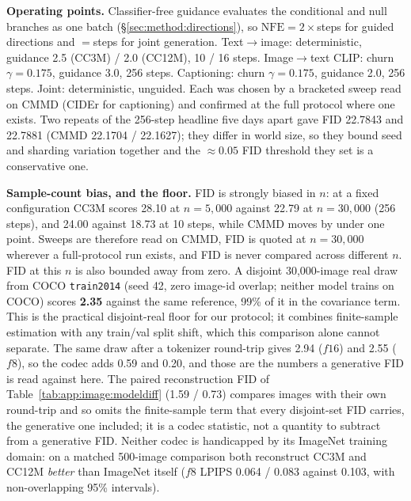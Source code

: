 \textbf{Operating points.} Classifier-free guidance evaluates the conditional and null branches as
one batch (\S\ref{sec:method:directions}), so $\mathrm{NFE}=2\times$steps for guided directions and
$=$steps for joint generation. Text$\rightarrow$image: deterministic, guidance 2.5 (CC3M) / 2.0
(CC12M), 10 / 16 steps. Image$\rightarrow$text CLIP: churn $\gamma{=}0.175$, guidance 3.0, 256
steps. Captioning: churn $\gamma{=}0.175$, guidance 2.0, 256 steps. Joint: deterministic,
unguided. Each was chosen by a bracketed sweep read on CMMD (CIDEr for captioning) and confirmed
at the full protocol where one exists. Two repeats of the 256-step headline five days apart gave
FID 22.7843 and 22.7881 (CMMD 22.1704 / 22.1627); they differ in world size, so they bound seed
and sharding variation together and the $\approx0.05$ FID threshold they set is a conservative
one.

\textbf{Sample-count bias, and the floor.} FID is strongly biased in $n$: at a fixed configuration
CC3M scores 28.10 at $n{=}5{,}000$ against 22.79 at $n{=}30{,}000$ (256 steps), and 24.00 against
18.73 at 10 steps, while CMMD moves by under one point. Sweeps are therefore read on CMMD, FID is
quoted at $n{=}30{,}000$ wherever a full-protocol run exists, and FID is never compared across
different $n$. FID at this $n$ is also bounded away from zero. A disjoint 30{,}000-image real draw
from COCO \texttt{train2014} (seed 42, zero image-id overlap; neither model trains on COCO) scores
\textbf{2.35} against the same reference, 99\% of it in the covariance term. This is the practical
disjoint-real floor for our protocol; it combines finite-sample estimation with any train/val
split shift, which this comparison alone cannot separate. The same draw after a tokenizer
round-trip gives 2.94 ($f16$) and 2.55 ($f8$), so the codec adds 0.59 and 0.20, and those are the
numbers a generative FID is read against here. The paired reconstruction FID of
Table~\ref{tab:app:image:modeldiff} (1.59 / 0.73) compares images with their own round-trip and so
omits the finite-sample term that every disjoint-set FID carries, the generative one included; it
is a codec statistic, not a quantity to subtract from a generative FID. Neither codec is
handicapped by its ImageNet training domain: on a matched 500-image comparison both reconstruct
CC3M and CC12M \emph{better} than ImageNet itself ($f8$ LPIPS 0.064 / 0.083 against 0.103, with
non-overlapping 95\% intervals).

